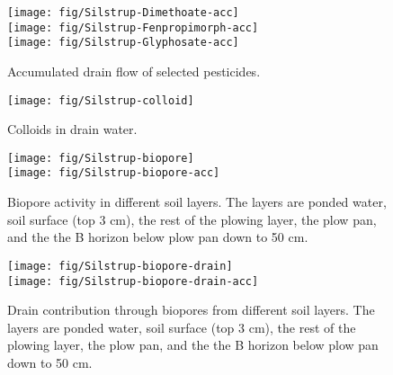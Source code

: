 \begin{figure}[htbp]
  \begin{center}
    \texttt{[image: fig/Silstrup-Dimethoate-acc]}\\
    \texttt{[image: fig/Silstrup-Fenpropimorph-acc]}\\
    \texttt{[image: fig/Silstrup-Glyphosate-acc]}
  \end{center}
  \caption{Accumulated drain flow of selected pesticides.}
  \label{fig:Silstrup-acc}
\end{figure}\FloatBarrier

\begin{figure}[htbp]
  \begin{center}
    \texttt{[image: fig/Silstrup-colloid]}
  \end{center}
  \caption{Colloids in drain water.}
  \label{fig:Silstrup-colloids}
\end{figure}\FloatBarrier

\begin{figure}[htbp]
  \begin{center}
    \texttt{[image: fig/Silstrup-biopore]}\\
    \texttt{[image: fig/Silstrup-biopore-acc]}\\
  \end{center}
  \caption{Biopore activity in different soil layers.  The layers are
    ponded water, soil surface (top 3 cm), the rest of the plowing layer,
    the plow pan, and the the B horizon below plow pan down to 50 cm.}
  \label{fig:Silstrup-biopore}
\end{figure}\FloatBarrier

\begin{figure}[htbp]
  \begin{center}
    \texttt{[image: fig/Silstrup-biopore-drain]}\\
    \texttt{[image: fig/Silstrup-biopore-drain-acc]}
  \end{center}
  \caption{Drain contribution through biopores from different soil
    layers.  The layers are ponded water, soil surface (top 3 cm), the
    rest of the plowing layer, the plow pan, and the the B horizon
    below plow pan down to 50 cm.}
  \label{fig:Silstrup-biopore-drain}
\end{figure}\FloatBarrier

